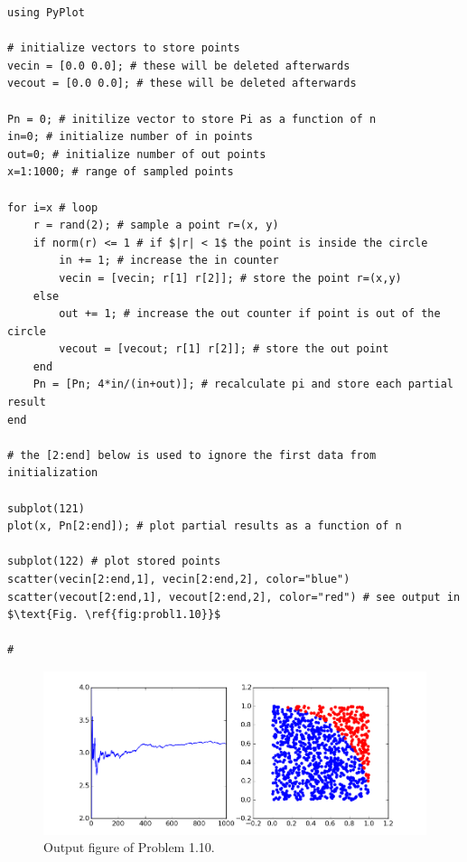 \begin{verbatim}
using PyPlot

# initialize vectors to store points
vecin = [0.0 0.0]; # these will be deleted afterwards
vecout = [0.0 0.0]; # these will be deleted afterwards

Pn = 0; # initilize vector to store Pi as a function of n
in=0; # initialize number of in points
out=0; # initialize number of out points
x=1:1000; # range of sampled points

for i=x # loop
    r = rand(2); # sample a point r=(x, y)
    if norm(r) <= 1 # if $|r| < 1$ the point is inside the circle
        in += 1; # increase the in counter
        vecin = [vecin; r[1] r[2]]; # store the point r=(x,y)
    else
        out += 1; # increase the out counter if point is out of the circle
        vecout = [vecout; r[1] r[2]]; # store the out point
    end
    Pn = [Pn; 4*in/(in+out)]; # recalculate pi and store each partial result
end

# the [2:end] below is used to ignore the first data from initialization

subplot(121)
plot(x, Pn[2:end]); # plot partial results as a function of n

subplot(122) # plot stored points
scatter(vecin[2:end,1], vecin[2:end,2], color="blue")
scatter(vecout[2:end,1], vecout[2:end,2], color="red") # see output in $\text{Fig. \ref{fig:probl1.10}}$

# 
\end{verbatim}


\begin{figure}[ht!]
 \centering
 \includegraphics[width=15cm,keepaspectratio=true]{Prob-1-10.png}
 \caption{Output figure of Problem 1.10.}
 \label{fig:probl1.10}
\end{figure}



















